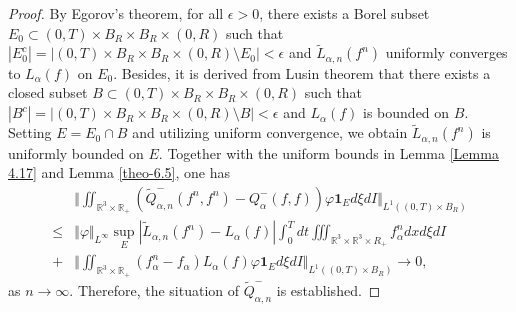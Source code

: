 \documentclass[reqno,11pt]{amsart}
\numberwithin{equation}{section}
\def\R{\mathbb{R}}
\begin{document}
\begin{proof}
	By Egorov's theorem, for all $\epsilon >0$, there exists a Borel subset $E_0 \subset (0,T)\times B_R \times B_R\times (0,R) $ such that $|E_0^c| = | (0,T)\times B_R \times B_R\times (0,R) \setminus E_0 | <\epsilon$ and $\tilde{L}_{\alpha ,n} (f^n)$ uniformly converges to $L_{\alpha } (f)$ on $E_0$. Besides, it is derived from Lusin theorem that  there exists a closed subset $B \subset (0,T)\times B_R \times B_R\times (0,R)$ such that $|B^c| = | (0,T)\times B_R \times B_R\times (0,R) \setminus B | <\epsilon$ and $L_\alpha (f)$ is bounded on $B$. Setting $E = E_0 \cap B$ and utilizing uniform convergence, we obtain $\tilde{L}_{\alpha ,n} (f^n) $ is uniformly bounded on $E$. Together with the uniform bounds in Lemma \ref{Lemma 4.17} and Lemma \ref{theo-6.5}, one has
	\begin{equation}\label{Qalpha}
		\begin{aligned}		
			&\Vert \iint_{\R^3 \times \R_+} (\tilde{Q}^-_{\alpha ,n}(f^n,f^n)-Q^-_{\alpha } (f,f))  \varphi \mathbf{1}_E d\xi dI \Vert_{L^1((0,T) \times B_R)}\\
			\leq & \Vert \varphi \Vert_{L^\infty }  \sup \limits_{E} |\tilde{L}_{\alpha ,n} (f^n)-L_\alpha (f)|  \int_{0}^{T}dt \iiint_{ \R^3 \times \R^3 \times R_+} f^n_\alpha dxd\xi dI \\
			+& \Vert \iint_{\R^3 \times \R_+} (f^n_\alpha -f_\alpha) L_\alpha(f) \varphi \mathbf{1}_E d\xi dI\Vert_{L^1((0,T) \times B_R)}
			\rightarrow 0 ,
		\end{aligned}
	\end{equation}
as $n\rightarrow \infty $.	Therefore, the situation of $ \tilde{Q}^-_{\alpha ,n}$ is established.


\end{proof}
\end{document}
